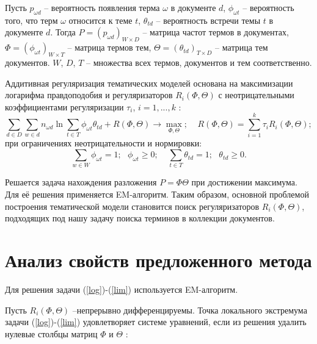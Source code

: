 \documentclass[a4paper, 12pt]{article}
\begin{document}
        Пусть $p_{\omega d}$ -- вероятность появления терма $\omega$ в документе $d$, $\phi_{\omega t}$ -- вероятность того, что терм $\omega$ относится к теме $t$, $\theta_{td}$ -- вероятность встречи темы $t$ в документе $d$. Тогда $P = (p_{\omega d})_{W \times D}$ -- матрица частот термов в документах, $\Phi = (\phi_{\omega t})_{W \times T}$ -- матрица термов тем, $\Theta = (\theta_{td})_{T \times D}$ -- матрица тем документов. $W$, $D$, $T$ -- множества всех термов, документов и тем соответственно.
       
        Аддитивная регуляризация тематических моделей основана на максимизации логарифма правдоподобия и регуляризаторов $R_i(\Phi, \Theta)$ с неотрицательными коэффициентами регуляризации $\tau_i$, $i = 1, ..., k$ \citep{vorontsov2020}:
        \begin{equation}\label{log}
            \sum\limits_{d \in D}\sum\limits_{w \in d}n_{\omega d}\ln\sum\limits_{t \in T}\phi_{\omega t}\theta_{td} + R(\Phi, \Theta) \to \max\limits_{\Phi, \Theta}; ~~~~~ R(\Phi, \Theta) = \sum\limits_{i = 1}^k\tau_iR_i(\Phi, \Theta);
        \end{equation}
        при ограничениях неотрицательности и нормировки:
        \begin{equation}\label{lim}
            \sum\limits_{w \in W}\phi_{\omega t} = 1; ~~~ \phi_{\omega t} \geq 0; ~~~~~ \sum\limits_{t \in T}\theta_{td} = 1; ~~~ \theta_{td} \geq 0.
        \end{equation}

    Решается задача нахождения разложения $P = \Phi\Theta$ при достижении максимума. Для её решения применяется EM-алгоритм. Таким образом, основной проблемой построения тематической модели становится поиск регуляризаторов $R_i(\Phi, \Theta)$, подходящих под нашу задачу поиска терминов в коллекции документов.

\section{Анализ свойств предложенного метода}

    Для решения задачи (\ref{log})-(\ref{lim}) используется EM-алгоритм.
    
    Пусть $R_i(\Phi, \Theta)$ --непрерывно дифференцируемы. Точка локального экстремума задачи (\ref{log})-(\ref{lim}) удовлетворяет системе уравнений, если из решения удалить нулевые столбцы матриц $\Phi$ и $\Theta$ \citep{vorontsov2020}:
\end{document}
